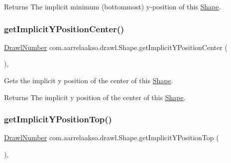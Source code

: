 \begin{DoxyReturn}{Returns}
The implicit minimum (bottommost) y-\/position of this \hyperlink{classcom_1_1aarrelaakso_1_1drawl_1_1_shape}{Shape}. 
\end{DoxyReturn}
\mbox{\label{classcom_1_1aarrelaakso_1_1drawl_1_1_shape_a0549739ee3201ae16091acce4ee6a5ac}} 
\subsubsection{\texorpdfstring{get\+Implicit\+Y\+Position\+Center()}{getImplicitYPositionCenter()}}
{\footnotesize\ttfamily \hyperlink{classcom_1_1aarrelaakso_1_1drawl_1_1_drawl_number}{Drawl\+Number} com.\+aarrelaakso.\+drawl.\+Shape.\+get\+Implicit\+Y\+Position\+Center (\begin{DoxyParamCaption}{ }\end{DoxyParamCaption})\hspace{0.3cm}{\ttfamily [protected]}, {\ttfamily [inherited]}}



Gets the implicit y position of the center of this \hyperlink{classcom_1_1aarrelaakso_1_1drawl_1_1_shape}{Shape}. 

\begin{DoxyReturn}{Returns}
The implicit y position of the center of this \hyperlink{classcom_1_1aarrelaakso_1_1drawl_1_1_shape}{Shape}. 
\end{DoxyReturn}
\mbox{\label{classcom_1_1aarrelaakso_1_1drawl_1_1_shape_afb64d51ac2023ad770bbc8f37061d5b0}} 
\subsubsection{\texorpdfstring{get\+Implicit\+Y\+Position\+Top()}{getImplicitYPositionTop()}}
{\footnotesize\ttfamily \hyperlink{classcom_1_1aarrelaakso_1_1drawl_1_1_drawl_number}{Drawl\+Number} com.\+aarrelaakso.\+drawl.\+Shape.\+get\+Implicit\+Y\+Position\+Top (\begin{DoxyParamCaption}{ }\end{DoxyParamCaption})\hspace{0.3cm}{\ttfamily [protected]}, {\ttfamily [inherited]}}



